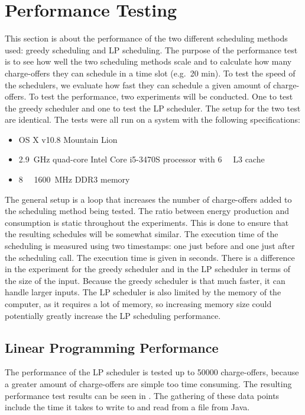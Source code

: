 \section{Performance Testing}\label{sec:evalperformance}
This section is about the performance of the two different scheduling methods used: greedy scheduling and LP scheduling. The purpose of the performance test is to see how well the two scheduling methods scale and to calculate how many charge-offers they can schedule in a time slot (e.g.\ 20 min). To test the speed of the schedulers, we evaluate how fast they can schedule a given amount of charge-offers. To test the performance, two experiments will be conducted. One to test the greedy scheduler and one to test the LP scheduler. The setup for the two test are identical. The tests were all run on a system with the following specifications:

\begin{itemize}
    \item OS X v10.8 Mountain Lion
    \item \SI{2.9}{\giga\hertz} quad-core Intel Core i5-3470S processor with \SI{6}{\mega\byte} L3 cache
    \item \SI{8}{\giga\byte} \SI{1600}{\mega\hertz} DDR3 memory
\end{itemize}

The general setup is a loop that increases the number of charge-offers added to the scheduling method being tested. The ratio between energy production and consumption is static throughout the experiments. This is done to ensure that the resulting schedules will be somewhat similar. The execution time of the scheduling is measured using two timestamps: one just before and one just after the scheduling call. The execution time is given in seconds. There is a difference in the experiment for the greedy scheduler and in the LP scheduler in terms of the size of the input. Because the greedy scheduler is that much faster, it can handle larger inputs. The LP scheduler is also limited by the memory of the computer, as it requires a lot of memory, so increasing memory size could potentially greatly increase the LP scheduling performance. 

\subsection{Linear Programming Performance}\label{subsec:lpperfromance}  
The performance of the LP scheduler is tested up to \num{50000} charge-offers, because a greater amount of charge-offers are simple too time consuming. The resulting performance test results can be seen in . The gathering of these data points include the time it takes to write to and read from a file from Java.

